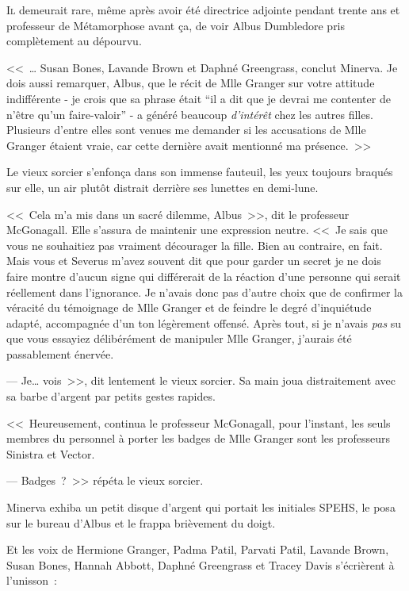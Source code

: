 
\lettrine{I}{l} demeurait rare, même après avoir été directrice adjointe pendant trente ans et professeur de Métamorphose avant ça, de voir Albus Dumbledore pris complètement au dépourvu.

<<~… Susan Bones, Lavande Brown et Daphné Greengrass, conclut Minerva. Je dois aussi remarquer, Albus, que le récit de Mlle Granger sur votre attitude indifférente - je crois que sa phrase était “il a dit que je devrai me contenter de n'être qu'un faire-valoir” - a généré beaucoup \emph{d'intérêt} chez les autres filles. Plusieurs d'entre elles sont venues me demander si les accusations de Mlle Granger étaient vraie, car cette dernière avait mentionné ma présence.~>>

Le vieux sorcier s'enfonça dans son immense fauteuil, les yeux toujours braqués sur elle, un air plutôt distrait derrière ses lunettes en demi-lune.

<<~Cela m'a mis dans un sacré dilemme, Albus~>>, dit le professeur McGonagall. Elle s'assura de maintenir une expression neutre. <<~Je sais que vous ne souhaitiez pas vraiment décourager la fille. Bien au contraire, en fait. Mais vous et Severus m'avez souvent dit que pour garder un secret je ne dois faire montre d'aucun signe qui différerait de la réaction d'une personne qui serait réellement dans l'ignorance. Je n'avais donc pas d'autre choix que de confirmer la véracité du témoignage de Mlle Granger et de feindre le degré d'inquiétude adapté, accompagnée d'un ton légèrement offensé. Après tout, si je n'avais \emph{pas} su que vous essayiez délibérément de manipuler Mlle Granger, j'aurais été passablement énervée.

--- Je… vois~>>, dit lentement le vieux sorcier. Sa main joua distraitement avec sa barbe d'argent par petits gestes rapides.

<<~Heureusement, continua le professeur McGonagall, pour l'instant, les seuls membres du personnel à porter les badges de Mlle Granger sont les professeurs Sinistra et Vector.

--- Badges~?~>> répéta le vieux sorcier.

Minerva exhiba un petit disque d'argent qui portait les initiales SPEHS, le posa sur le bureau d'Albus et le frappa brièvement du doigt.

Et les voix de Hermione Granger, Padma Patil, Parvati Patil, Lavande Brown, Susan Bones, Hannah Abbott, Daphné Greengrass et Tracey Davis s'écrièrent à l'unisson~:

